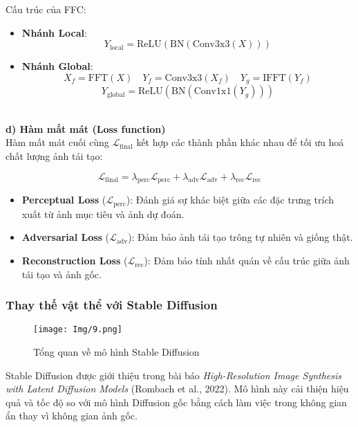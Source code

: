 \documentclass[12pt]{report}
\begin{document}
Cấu trúc của FFC:

\begin{itemize}
    \item \textbf{Nhánh Local}: 
    \[
    Y_{\text{local}} = \text{ReLU}(\text{BN}(\text{Conv3x3}(X)))
    \]
    
    \item \textbf{Nhánh Global}: 
    \[
    X_f = \text{FFT}(X) \quad
    Y_f = \text{Conv3x3}(X_f) \quad
    Y_g = \text{IFFT}(Y_f)
    \]
    \[
    Y_{\text{global}} = \text{ReLU}(\text{BN}(\text{Conv1x1}(Y_g)))
    \]
\end{itemize}\\
\textbf{d) Hàm mất mát (Loss function)} \\
Hàm mất mát cuối cùng \( \mathcal{L}_{\text{final}} \) kết hợp các thành phần khác nhau để tối ưu hoá chất lượng ảnh tái tạo:

\[
\mathcal{L}_{\text{final}} = \lambda_{\text{perc}} \mathcal{L}_{\text{perc}} + \lambda_{\text{adv}} \mathcal{L}_{\text{adv}} + \lambda_{\text{rec}} \mathcal{L}_{\text{rec}}
\]

\begin{itemize}
    \item \textbf{Perceptual Loss} (\( \mathcal{L}_{\text{perc}} \)): Đánh giá sự khác biệt giữa các đặc trưng trích xuất từ ảnh mục tiêu và ảnh dự đoán.
    \item \textbf{Adversarial Loss} (\( \mathcal{L}_{\text{adv}} \)): Đảm bảo ảnh tái tạo trông tự nhiên và giống thật.
    \item \textbf{Reconstruction Loss} (\( \mathcal{L}_{\text{rec}} \)): Đảm bảo tính nhất quán về cấu trúc giữa ảnh tái tạo và ảnh gốc.
\end{itemize}
\subsubsection*{Thay thế vật thể với Stable Diffusion}

\begin{figure}[H]
    \centering
    \texttt{[image: Img/9.png]}
    \caption{Tổng quan về mô hình Stable Diffusion}
\end{figure}

Stable Diffusion được giới thiệu trong bài báo \textit{High-Resolution Image Synthesis with Latent Diffusion Models} (Rombach et al., 2022). Mô hình này cải thiện hiệu quả và tốc độ so với mô hình Diffusion gốc bằng cách làm việc trong không gian ẩn thay vì không gian ảnh gốc.
\end{document}
